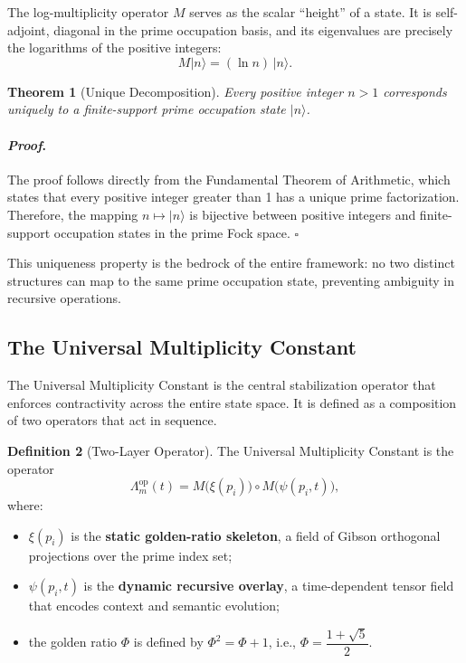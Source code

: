 \documentclass[12pt]{article}
\theoremstyle{plain}
\newtheorem{theorem}{Theorem}[section]
\theoremstyle{definition}
\newtheorem{definition}[theorem]{Definition}
\theoremstyle{remark}
\renewenvironment{proof}{\paragraph{\textit{Proof}.}}{\hfill$\square$}
\begin{document}
The log-multiplicity operator $M$ serves as the scalar ``height'' of a state. It is self-adjoint, diagonal in the prime occupation basis, and its eigenvalues are precisely the logarithms of the positive integers:
\[
M |n\rangle = (\ln n)\, |n\rangle.
\]

\begin{theorem}[Unique Decomposition]
Every positive integer $n > 1$ corresponds uniquely to a finite-support prime occupation state $|n\rangle$.
\end{theorem}

\begin{proof}
The proof follows directly from the Fundamental Theorem of Arithmetic, which states that every positive integer greater than 1 has a unique prime factorization. Therefore, the mapping $n \mapsto |n\rangle$ is bijective between positive integers and finite-support occupation states in the prime Fock space.
\end{proof}

This uniqueness property is the bedrock of the entire framework: no two distinct structures can map to the same prime occupation state, preventing ambiguity in recursive operations.

\subsection{The Universal Multiplicity Constant}

The Universal Multiplicity Constant is the central stabilization operator that enforces contractivity across the entire state space. It is defined as a composition of two operators that act in sequence.

\begin{definition}[Two-Layer Operator]
The Universal Multiplicity Constant is the operator
\[
\Lambda_m^{\text{op}}(t) = M\bigl(\xi(p_i)\bigr) \circ M\bigl(\psi(p_i, t)\bigr),
\]
where:
\begin{itemize}
    \item $\xi(p_i)$ is the \textbf{static golden-ratio skeleton}, a field of Gibson orthogonal projections over the prime index set;
    \item $\psi(p_i, t)$ is the \textbf{dynamic recursive overlay}, a time-dependent tensor field that encodes context and semantic evolution;
    \item the golden ratio $\Phi$ is defined by $\Phi^2 = \Phi + 1$, i.e., $\Phi = \dfrac{1+\sqrt{5}}{2}$.
\end{itemize}
\end{definition}
\end{document}
